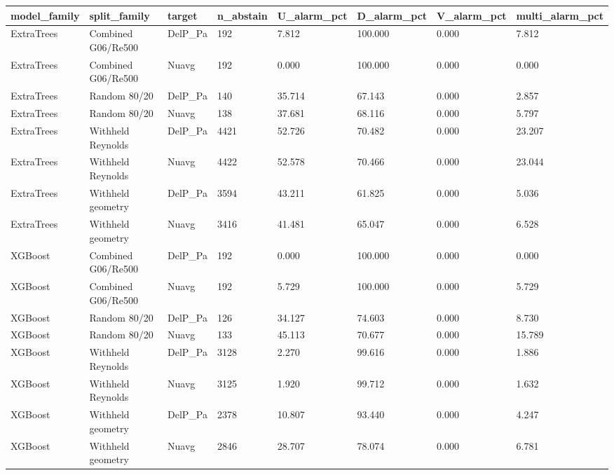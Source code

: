\begin{tabular}{llllllll}
\hline
model_family & split_family & target & n_abstain & U_alarm_pct & D_alarm_pct & V_alarm_pct & multi_alarm_pct \\
\hline
ExtraTrees & Combined G06/Re500 & DelP_Pa & 192 & 7.812 & 100.000 & 0.000 & 7.812 \\
ExtraTrees & Combined G06/Re500 & Nuavg & 192 & 0.000 & 100.000 & 0.000 & 0.000 \\
ExtraTrees & Random 80/20 & DelP_Pa & 140 & 35.714 & 67.143 & 0.000 & 2.857 \\
ExtraTrees & Random 80/20 & Nuavg & 138 & 37.681 & 68.116 & 0.000 & 5.797 \\
ExtraTrees & Withheld Reynolds & DelP_Pa & 4421 & 52.726 & 70.482 & 0.000 & 23.207 \\
ExtraTrees & Withheld Reynolds & Nuavg & 4422 & 52.578 & 70.466 & 0.000 & 23.044 \\
ExtraTrees & Withheld geometry & DelP_Pa & 3594 & 43.211 & 61.825 & 0.000 & 5.036 \\
ExtraTrees & Withheld geometry & Nuavg & 3416 & 41.481 & 65.047 & 0.000 & 6.528 \\
XGBoost & Combined G06/Re500 & DelP_Pa & 192 & 0.000 & 100.000 & 0.000 & 0.000 \\
XGBoost & Combined G06/Re500 & Nuavg & 192 & 5.729 & 100.000 & 0.000 & 5.729 \\
XGBoost & Random 80/20 & DelP_Pa & 126 & 34.127 & 74.603 & 0.000 & 8.730 \\
XGBoost & Random 80/20 & Nuavg & 133 & 45.113 & 70.677 & 0.000 & 15.789 \\
XGBoost & Withheld Reynolds & DelP_Pa & 3128 & 2.270 & 99.616 & 0.000 & 1.886 \\
XGBoost & Withheld Reynolds & Nuavg & 3125 & 1.920 & 99.712 & 0.000 & 1.632 \\
XGBoost & Withheld geometry & DelP_Pa & 2378 & 10.807 & 93.440 & 0.000 & 4.247 \\
XGBoost & Withheld geometry & Nuavg & 2846 & 28.707 & 78.074 & 0.000 & 6.781 \\
\hline
\end{tabular}
